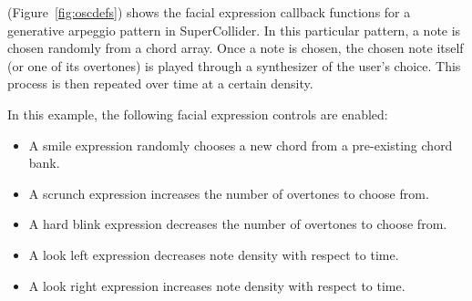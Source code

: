 (Figure~\ref{fig:oscdefs}) shows the facial expression callback functions for a generative arpeggio pattern in SuperCollider. In this particular pattern, a note is chosen randomly from a chord array. Once a note is chosen, the chosen note itself (or one of its overtones) is played through a synthesizer of the user's choice. This process is then repeated over time at a certain density. 

In this example, the following facial expression controls are enabled:

\begin{itemize}
\item A smile expression randomly chooses a new chord from a pre-existing chord bank. 
\item A scrunch expression increases the number of overtones to choose from. 
\item A hard blink expression decreases the number of overtones to choose from. 
\item A look left expression decreases note density with respect to time. 
\item A look right expression increases note density with respect to time.
\end{itemize}




